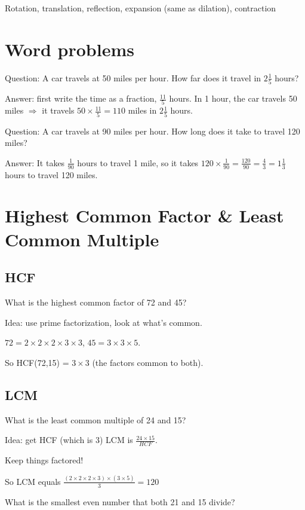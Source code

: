 \documentclass[fullpage,twocolumn]{article}
\newcommand{\vp}{{\vspace{0.1in}}}
\begin{document}
Rotation, translation, reflection, expansion (same as dilation), contraction


\section{Word problems}

Question: A car travels at 50 miles per hour. How far does it
travel in $2\frac{1}{5}$ hours?

\vp
Answer: first write the time as a fraction, $\frac{11}{5}$ hours.
In 1 hour, the car travels 50 miles $\Rightarrow$ it travels $50 \times \frac{11}{5} = 110$ miles in
$2\frac{1}{5}$ hours.

Question: A car travels at 90 miles per hour. How long does it take to travel 120 miles?

\vp
Answer: It takes $\frac{1}{90}$ hours to travel 1 mile, so it takes $120\times \frac{1}{90} = \frac{120}{90} = \frac{4}{3} = 1 \frac{1}{3}$ hours to travel 120 miles.

\section{
Highest Common Factor \& Least Common Multiple
}


\subsection{HCF}
What is the highest common factor of 72 and 45?

Idea: use prime factorization, look at what's common.

$72 = 2 \times 2 \times 2 \times 3 \times 3 $, $45 = 3 \times 3 \times 5$.

So HCF(72,15) = $ 3 \times 3 $ (the factors common to both).

\subsection{LCM}

What is the least common multiple of 24 and 15?

Idea:  get HCF (which is 3)
LCM is $\frac{24 \times 15}{HCF}$.

Keep things factored!

So LCM equals 
$\frac{(2 \times 2 \times 2 \times 3) \times (3 \times 5)}{ 3} = 120$

What is the smallest even number that both 21 and 15 divide?
\end{document}
